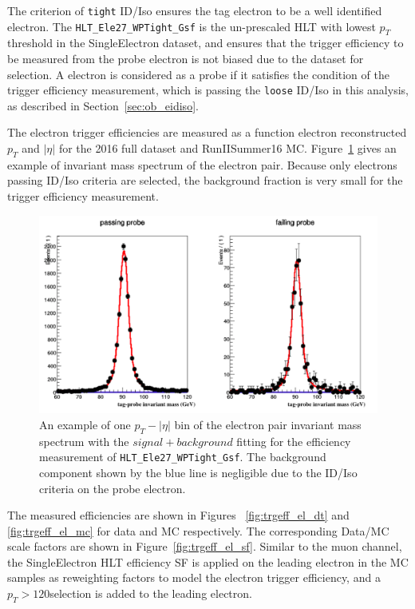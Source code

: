 The criterion of \texttt{tight} ID/Iso ensures the tag electron to be a well identified electron. The \texttt{HLT\_Ele27\_WPTight\_Gsf} is the un-prescaled HLT with lowest $p_T$ threshold in the SingleElectron dataset, and ensures that the trigger efficiency to be measured from the probe electron is not biased due to the dataset for selection. A electron is considered as a probe if it satisfies the condition of the trigger efficiency measurement, which is passing the \texttt{loose} ID/Iso in this analysis, as described in Section~\ref{sec:ob_eidiso}.

\vspace{0.3cm}
The electron trigger efficiencies are measured as a function electron reconstructed $p_T$ and $|\eta|$ for the 2016 full dataset and RunIISummer16 MC. Figure~\ref{fig:bg_etrgtnp} gives an example of invariant mass spectrum of the electron pair. Because only electrons passing ID/Iso criteria are selected, the background fraction is very small for the trigger efficiency measurement.

\begin{figure}[htpb]
\begin{center}
\includegraphics[width=0.95\linewidth, page=1]{figures/bg_etrgtnp.png}
\caption{An example of one  $p_T - |\eta|$ bin of the electron pair invariant mass spectrum with the $signal+background$ fitting for the efficiency measurement of \texttt{HLT\_Ele27\_WPTight\_Gsf}. The background component shown by the blue line is negligible due to the ID/Iso criteria on the probe electron.}
\label{fig:bg_etrgtnp}
\end{center}
\end{figure}

\vspace{0.3cm}
The measured efficiencies are shown in Figures ~\ref{fig:trgeff_el_dt} and \ref{fig:trgeff_el_mc} for data and MC respectively. The corresponding Data/MC scale factors are shown in Figure~\ref{fig:trgeff_el_sf}. Similar to the muon channel, the SingleElectron HLT efficiency SF is applied on the leading electron in the MC samples as reweighting factors to model the electron trigger efficiency, and a $p_T > 120$\GeV selection is added to the leading electron.

